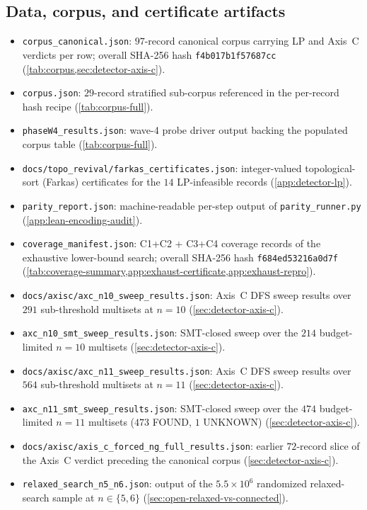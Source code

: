 \documentclass[11pt,a4paper]{article}
\theoremstyle{plain}
\theoremstyle{definition}
\begin{document}
\subsection{Data, corpus, and certificate artifacts}\label{app:manifest-data}
\begin{itemize}[leftmargin=*]
\item \texttt{corpus\_canonical.json}: $97$-record canonical corpus carrying LP and Axis~C verdicts
 per row; overall SHA-256 hash \texttt{f4b017b1f57687cc}
 (\cref{tab:corpus,sec:detector-axis-c}).
\item \texttt{corpus.json}: $29$-record stratified sub-corpus
 referenced in the per-record hash recipe (\cref{tab:corpus-full}).
\item \texttt{phaseW4\_results.json}: wave-4 probe driver
 output backing the populated corpus table
 (\cref{tab:corpus-full}).
\item \texttt{docs/topo\_revival/farkas\_certificates.json}: integer-valued topological-sort (Farkas) certificates for the
 $14$ LP-infeasible records (\cref{app:detector-lp}).
\item \texttt{parity\_report.json}: machine-readable per-step
 output of \texttt{parity\_runner.py}
 (\cref{app:lean-encoding-audit}).
\item \texttt{coverage\_manifest.json}: C1+C2 + C3+C4 coverage
 records of the exhaustive lower-bound search; overall SHA-256
 hash \texttt{f684ed53216a0d7f}
 (\cref{tab:coverage-summary,app:exhaust-certificate,app:exhaust-repro}).
\item \texttt{docs/axisc/axc\_n10\_sweep\_results.json}: Axis~C DFS sweep results over $291$ sub-threshold multisets
 at $n = 10$ (\cref{sec:detector-axis-c}).
\item \texttt{axc\_n10\_smt\_sweep\_results.json}: SMT-closed
 sweep over the $214$ budget-limited $n = 10$ multisets
 (\cref{sec:detector-axis-c}).
\item \texttt{docs/axisc/axc\_n11\_sweep\_results.json}: Axis~C DFS sweep results over $564$ sub-threshold multisets
 at $n = 11$ (\cref{sec:detector-axis-c}).
\item \texttt{axc\_n11\_smt\_sweep\_results.json}: SMT-closed
 sweep over the $474$ budget-limited $n = 11$ multisets ($473$
 FOUND, $1$ UNKNOWN) (\cref{sec:detector-axis-c}).
\item \texttt{docs/axisc/axis\_c\_forced\_ng\_full\_results.json}: earlier $72$-record slice of the Axis~C verdict preceding
 the canonical corpus (\cref{sec:detector-axis-c}).
\item \texttt{relaxed\_search\_n5\_n6.json}: output of the
 $5.5 \times 10^6$ randomized relaxed-search sample at
 $n \in \{5, 6\}$ (\cref{sec:open-relaxed-vs-connected}).
\end{itemize}
\end{document}
